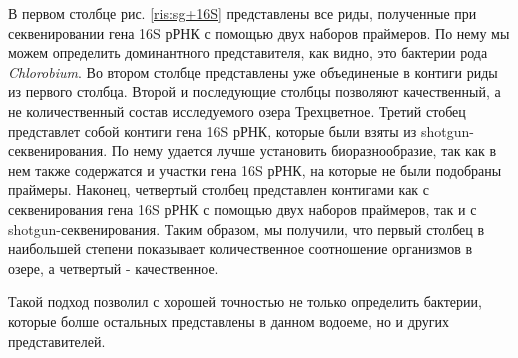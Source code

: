 В первом столбце рис. \ref{ris:sg+16S} представлены все риды, полученные при секвенировании гена 16S рРНК с помощью двух наборов праймеров. По нему мы можем определить доминантного представителя, как видно, это бактерии рода \textit{Chlorobium}. Во втором столбце представлены уже объединеные в контиги риды из первого столбца. Второй и последующие столбцы позволяют качественный, а не количественный состав исследуемого озера Трехцветное. Третий стобец представлет собой контиги гена 16S рРНК, которые были взяты из shotgun-секвенирования. По нему удается лучше установить биоразнообразие, так как в нем также содержатся и участки гена 16S рРНК, на которые не были подобраны праймеры. Наконец, четвертый столбец представлен контигами как с секвенирования гена 16S рРНК с помощью двух наборов праймеров, так и с shotgun-секвенирования. Таким образом, мы получили, что первый столбец в наибольшей степени показывает количественное соотношение организмов в озере, а четвертый - качественное. 

Такой подход позволил с хорошей точностью не только определить бактерии, которые болше остальных представлены в данном водоеме, но и других представителей. 


\clearpage
